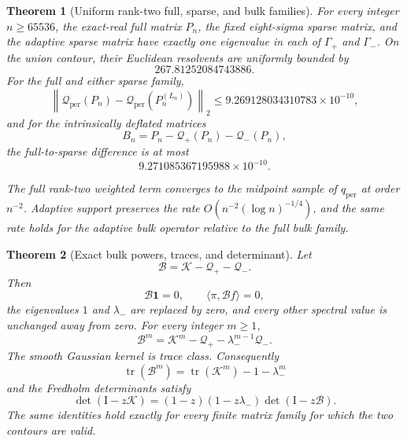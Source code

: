 \documentclass[11pt]{article}
\newtheorem{theorem}{Theorem}[section]
\theoremstyle{definition}
\theoremstyle{remark}
\newcommand{\Id}{\mathrm I}
\newcommand{\cK}{\mathcal K}
\newcommand{\cB}{\mathcal B}
\newcommand{\cQ}{\mathcal Q}
\newcommand{\norm}[1]{\left\lVert #1\right\rVert}
\newcommand{\tr}{\operatorname{tr}}
\newcommand{\detF}{\operatorname{det}}
\begin{document}
\begin{theorem}[Uniform rank-two full, sparse, and bulk families]
\label{thm:families}
For every integer $n\ge65536$, the exact-real full matrix $P_n$, the fixed
eight-sigma sparse matrix, and the adaptive sparse matrix have exactly one
eigenvalue in each of $\Gamma_+$ and $\Gamma_-$.  On the union contour,
their Euclidean resolvents are uniformly bounded by
\begin{equation}
 267.81252084743886.
 \label{eq:union-resolvent}
\end{equation}
For the full and either sparse family,
\begin{equation}
 \norm{\cQ_{\mathrm{per}}(P_n)
       -\cQ_{\mathrm{per}}(P_n^{(L_n)})}_2
 \le9.269128034310783\times10^{-10},
 \label{eq:rank-two-cutoff}
\end{equation}
and for the intrinsically deflated matrices
\begin{equation}
 B_n=P_n-\cQ_+(P_n)-\cQ_-(P_n),
 \label{eq:matrix-bulk}
\end{equation}
the full-to-sparse difference is at most
\begin{equation}
 9.271085367195988\times10^{-10}.
 \label{eq:bulk-cutoff}
\end{equation}

The full rank-two weighted term converges to the midpoint sample of
$q_{\mathrm{per}}$ at order $n^{-2}$.  Adaptive support preserves the rate
$O(n^{-2}(\log n)^{-1/4})$, and the same rate holds for the adaptive bulk
operator relative to the full bulk family.
\end{theorem}

\begin{theorem}[Exact bulk powers, traces, and determinant]
\label{thm:bulk-algebra}
Let
\begin{equation}
 \cB=\cK-\cQ_+-\cQ_-.
 \label{eq:continuum-bulk}
\end{equation}
Then
\begin{equation}
 \cB\mathbf1=0,
 \qquad
 \langle\pi,\cB f\rangle=0,
 \label{eq:bulk-constraints}
\end{equation}
the eigenvalues $1$ and $\lambda_-$ are replaced by zero, and every other
spectral value is unchanged away from zero.  For every integer $m\ge1$,
\begin{equation}
 \cB^m
 =\cK^m-\cQ_+-\lambda_-^{m-1}\cQ_-.
 \label{eq:power-identity}
\end{equation}
The smooth Gaussian kernel is trace class.  Consequently
\begin{equation}
 \tr(\cB^m)=\tr(\cK^m)-1-\lambda_-^m
 \label{eq:trace-identity}
\end{equation}
and the Fredholm determinants satisfy
\begin{equation}
 \detF(\Id-z\cK)
 =(1-z)(1-z\lambda_-)\detF(\Id-z\cB).
 \label{eq:det-factorization}
\end{equation}
The same identities hold exactly for every finite matrix family for which
the two contours are valid.
\end{theorem}
\end{document}
